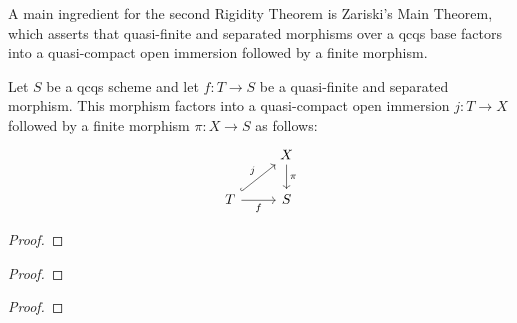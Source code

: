             A main ingredient for the second Rigidity Theorem is Zariski's Main Theorem, which asserts that quasi-finite and separated morphisms over a qcqs base factors into a quasi-compact open immersion followed by a finite morphism.
            \begin{lemma} \label{lemma: zasriski_main_theorem}
                \cite[\href{https://stacks.math.columbia.edu/tag/05K0}{Tag 05K0}]{stacks} Let $S$ be a qcqs scheme and let $f: T \to S$ be a quasi-finite and separated morphism. This morphism factors into a quasi-compact open immersion $j: T \to X$ followed by a finite morphism $\pi: X \to S$ as follows:
                    $$
                        \begin{tikzcd}
                        	& X \\
                        	T & S
                        	\arrow["f"', from=2-1, to=2-2]
                        	\arrow["j", hook, from=2-1, to=1-2]
                        	\arrow["\pi", from=1-2, to=2-2]
                        \end{tikzcd}
                    $$
            \end{lemma}
                \begin{proof}
                    
                \end{proof}
            \begin{proposition}[Finite = proper + finite fibres] \label{lemma: finite_iff_proper_with_finite_fibres}
                
            \end{proposition}
                \begin{proof}
                    
                \end{proof}
            \begin{corollary}
                
            \end{corollary}
                \begin{proof}
                    
                \end{proof}
